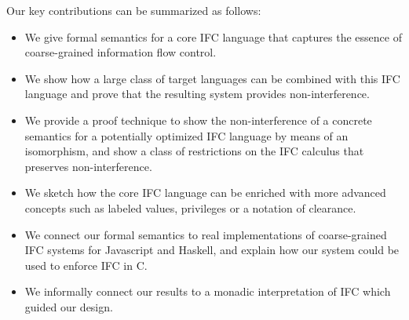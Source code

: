 Our key contributions can be summarized as follows:
\begin{itemize}
  \item We give formal semantics for a core IFC language that
  captures the essence of coarse-grained information flow control.
  \item We show how a large class of target languages can be combined
  with this IFC language and prove that the resulting system provides
  non-interference.
  \item We provide a proof technique to show the non-interference
  of a concrete semantics for a potentially optimized IFC language
  by means of an isomorphism, and show a class of restrictions on
  the IFC calculus that preserves non-interference.
  \item We sketch how the core IFC language can be enriched with
  more advanced concepts such as labeled values, privileges or a
  notation of clearance.
  \item We connect our formal semantics to real implementations of
  coarse-grained IFC systems for Javascript and Haskell, and explain
  how our system could be used to enforce IFC in C.
  \item We informally connect our results to a monadic interpretation
  of IFC which guided our design.
\end{itemize}


